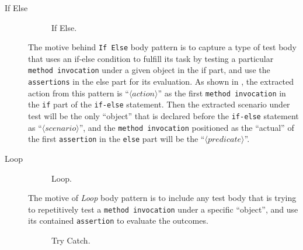 \begin{description}

\item[If Else]

\begin{figure}[htbp]
\centering
    \begin{subfigure}{0.6\textwidth}
    \end{subfigure}
\caption{If Else.}
\label{ifElse}
\end{figure}

The motive behind \texttt{If Else} body pattern is to capture a type of test body that uses an if-else condition to fulfill its task by testing a particular \texttt{method invocation} under a given object in the if part, and use the \texttt{assertions} in the else part for its evaluation.
%
As shown in , the extracted action from this pattern is \enquote{$\langle action \rangle$} as the first \texttt{method invocation} in the \texttt{if} part of the \texttt{if-else} statement.
%
Then the extracted scenario under test will be the only \enquote{object} that is declared before the \texttt{if-else} statement as \enquote{$\langle scenario \rangle$}, and the \texttt{method invocation} positioned as the \enquote{actual} of the first \texttt{assertion} in the \texttt{else} part will be the \enquote{$\langle predicate \rangle$}.


\item[Loop]

\begin{figure}[htbp]
\centering
    \begin{subfigure}{0.65\textwidth}
    \end{subfigure}
\caption{Loop.}
\label{loopPattern}
\end{figure}

The motive of \textit{Loop} body pattern is to include any test body that is trying to repetitively test a \texttt{method invocation} under a specific \enquote{object}, and use its contained \texttt{assertion} to evaluate the outcomes.

\begin{figure}[H]
\centering
    \begin{subfigure}{0.65\textwidth}
    \end{subfigure}
\caption{Try Catch.}
\label{tryCP}
\end{figure}


\end{description}
